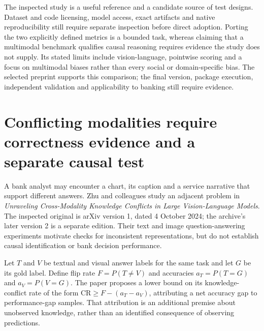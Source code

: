 The inspected study is a useful reference and a candidate source of test
designs. Dataset and code licensing, model access, exact artifacts and
native reproducibility still require separate inspection before direct
adoption. Porting the two explicitly defined metrics is a bounded task,
whereas claiming that a multimodal benchmark qualifies causal reasoning
requires evidence the study does not supply. Its stated limits include
vision-language, pointwise scoring and a focus on multimodal biases rather
than every social or domain-specific bias. The selected preprint supports this comparison; the final version, package execution, independent validation and applicability to banking still require evidence.
\citep{exec24_judgebias_original,exec24_judgebias_reference}


\section{Conflicting modalities require correctness evidence and a separate causal test}
\label{exec23:conflict-scope}

A bank analyst may encounter a chart, its caption and a service narrative that
support different answers. Zhu and colleagues study an adjacent problem in
\emph{Unraveling Cross-Modality Knowledge Conflicts in Large Vision-Language
Models}. The inspected original is arXiv version 1, dated 4 October 2024;
the archive's later version 2 is a separate edition. Their text and image
question-answering experiments motivate checks for inconsistent representations,
but do not establish causal identification or bank decision performance.
\citep{exec23_cross_modality_conflict}

Let $T$ and $V$ be textual and visual answer labels for the same task and let
$G$ be its gold label. Define flip rate $F=P(T\ne V)$ and accuracies
$a_T=P(T=G)$ and $a_V=P(V=G)$. The paper proposes a lower bound on its
knowledge-conflict rate of the form $\mathrm{CR}\geq F-(a_T-a_V)$, attributing
a net accuracy gap to performance-gap samples. That attribution is an
additional premise about unobserved knowledge, rather than an identified
consequence of observing predictions.~\citep{exec23_cross_modality_conflict}

